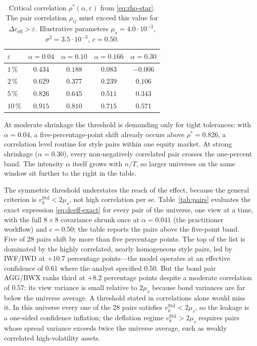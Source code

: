 \documentclass[a4paper,11pt]{article}
\theoremstyle{plain}
\theoremstyle{definition}
\newcommand{\Std}{\mathrm{Std}}
\newcommand{\eff}{\mathrm{eff}}
\begin{document}
\begin{table}[H]
\centering
\caption{Critical correlation $\rho^*(\alpha,\varepsilon)$ from
\eqref{eq:rho-star}. The pair correlation $\rho_{ij}$ must exceed this
value for $\Delta c_{\eff} > \varepsilon$. Illustrative parameters
$\mu_s = 4.0\cdot 10^{-3}$, $\sigma^2 = 3.5\cdot 10^{-3}$, $c = 0.50$.}
\label{tab:rho-star}
\begin{tabular}{lcccc}
\toprule
$\varepsilon$ & $\alpha = 0.04$ & $\alpha = 0.10$ & $\alpha = 0.166$ & $\alpha = 0.30$ \\
\midrule
$1\,\%$  & $0.434$ & $0.188$ & $0.083$ & $-0.006$ \\
$2\,\%$  & $0.629$ & $0.377$ & $0.239$ & $0.106$ \\
$5\,\%$  & $0.826$ & $0.645$ & $0.511$ & $0.343$ \\
$10\,\%$ & $0.915$ & $0.810$ & $0.715$ & $0.571$ \\
\bottomrule
\end{tabular}
\end{table}

At moderate shrinkage the threshold is demanding only for tight
tolerances: with $\alpha = 0.04$, a five-percentage-point shift already
occurs above $\rho^* = 0.826$, a correlation level routine for style
pairs within one equity market. At strong shrinkage ($\alpha = 0.30$),
every non-negatively correlated pair crosses the one-percent band. The
intensity $\alpha$ itself grows with $n/T$, so larger universes on the
same window sit further to the right in the table.

The symmetric threshold understates the reach of the effect, because the
general criterion is $v_k^\Std < 2\mu_s$, not high correlation per se.
Table~\ref{tab:pairs} evaluates the exact expression
\eqref{eq:dceff-exact} for every pair of the universe, one view at a
time, with the full $8\times 8$ covariance shrunk once at
$\alpha = 0.041$ (the practitioner workflow) and $c = 0.50$; the table
reports the pairs above the five-point band. Five of 28 pairs shift by
more than five percentage points. The top of the list is dominated by
the highly correlated, nearly homogeneous style pairs, led by IWF/IWD at
$+10.7$ percentage points---the model operates at an effective
confidence of $0.61$ where the analyst specified $0.50$. But the bond
pair AGG/BWX ranks third at $+8.2$ percentage points despite a moderate
correlation of $0.57$: its view variance is small relative to $2\mu_s$
because bond variances are far below the universe average. A threshold
stated in correlations alone would miss it. In this universe every one
of the 28 pairs satisfies $v_k^\Std < 2\mu_s$, so the leakage is a
one-sided confidence inflation; the deflation regime
$v_k^\Std > 2\mu_s$ requires pairs whose spread variance exceeds twice
the universe average, such as weakly correlated high-volatility assets.
\end{document}
